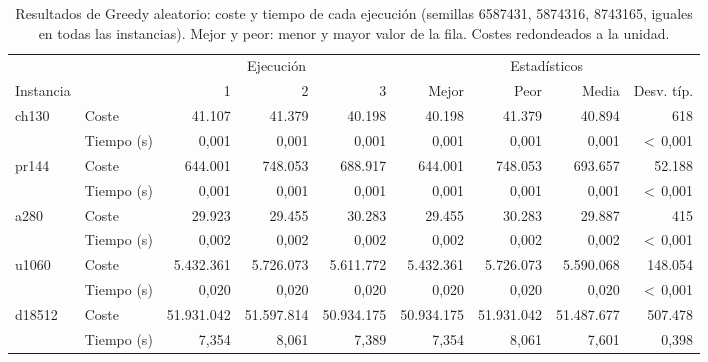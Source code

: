 \begin{table}[H]
\centering\small\setlength{\tabcolsep}{4pt}\renewcommand{\arraystretch}{1.15}
\begin{adjustbox}{max width=\textwidth}
\begin{tabular}{llrrrrrrr}
\toprule
 & & \multicolumn{3}{c}{Ejecución} & \multicolumn{4}{c}{Estadísticos} \\
\cmidrule(lr){3-5}\cmidrule(lr){6-9}
Instancia & & 1 & 2 & 3 & Mejor & Peor & Media & Desv. típ. \\
\midrule
\rowcolor{gray!10}ch130 & Coste & 41{.}107 & 41{.}379 & 40{.}198 & 40{.}198 & 41{.}379 & 40{.}894 & 618 \\
\rowcolor{gray!10} & Tiempo (s) & 0{,}001 & 0{,}001 & 0{,}001 & 0{,}001 & 0{,}001 & 0{,}001 & $<$\,0{,}001 \\
pr144 & Coste & 644{.}001 & 748{.}053 & 688{.}917 & 644{.}001 & 748{.}053 & 693{.}657 & 52{.}188 \\
 & Tiempo (s) & 0{,}001 & 0{,}001 & 0{,}001 & 0{,}001 & 0{,}001 & 0{,}001 & $<$\,0{,}001 \\
\rowcolor{gray!10}a280 & Coste & 29{.}923 & 29{.}455 & 30{.}283 & 29{.}455 & 30{.}283 & 29{.}887 & 415 \\
\rowcolor{gray!10} & Tiempo (s) & 0{,}002 & 0{,}002 & 0{,}002 & 0{,}002 & 0{,}002 & 0{,}002 & $<$\,0{,}001 \\
u1060 & Coste & 5{.}432{.}361 & 5{.}726{.}073 & 5{.}611{.}772 & 5{.}432{.}361 & 5{.}726{.}073 & 5{.}590{.}068 & 148{.}054 \\
 & Tiempo (s) & 0{,}020 & 0{,}020 & 0{,}020 & 0{,}020 & 0{,}020 & 0{,}020 & $<$\,0{,}001 \\
\rowcolor{gray!10}d18512 & Coste & 51{.}931{.}042 & 51{.}597{.}814 & 50{.}934{.}175 & 50{.}934{.}175 & 51{.}931{.}042 & 51{.}487{.}677 & 507{.}478 \\
\rowcolor{gray!10} & Tiempo (s) & 7{,}354 & 8{,}061 & 7{,}389 & 7{,}354 & 8{,}061 & 7{,}601 & 0{,}398 \\
\bottomrule
\end{tabular}
\end{adjustbox}
\caption[Resultados de Greedy aleatorio]{Resultados de Greedy aleatorio: coste y tiempo de cada ejecución (semillas 6587431, 5874316, 8743165, iguales en todas las instancias). Mejor y peor: menor y mayor valor de la fila. Costes redondeados a la unidad.}
\label{tab:grea-res}
\end{table}
